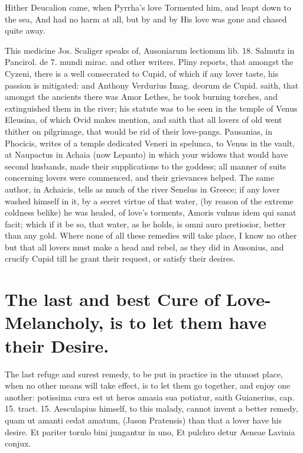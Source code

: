 {Hither Deucalion came, when Pyrrha's love
Tormented him, and leapt down to the sea,
And had no harm at all, but by and by
His love was gone and chased quite away.

This medicine Jos. Scaliger speaks of, Ausoniarum lectionum lib. 18.
Salmutz in Pancirol. de 7. mundi mirac. and other writers. Pliny
reports, that amongst the Cyzeni, there is a well consecrated to Cupid,
of which if any lover taste, his passion is mitigated: and Anthony
Verdurius Imag. deorum de Cupid. saith, that amongst the ancients there
was Amor Lethes, he took burning torches, and extinguished them
in the river; his statute was to be seen in the temple of Venus
Eleusina, of which Ovid makes mention, and saith that all lovers of old
went thither on pilgrimage, that would be rid of their love-pangs.
Pausanias, in  Phocicis, writes of a temple dedicated Veneri in
spelunca, to Venus in the vault, at Naupactus in Achaia (now Lepanto)
in which your widows that would have second husbands, made their
supplications to the goddess; all manner of suits concerning lovers
were commenced, and their grievances helped. The same author, in
Achaicis, tells as much of the river  Senelus in Greece; if any
lover washed himself in it, by a secret virtue of that water, (by
reason of the extreme coldness belike) he was healed, of love's
torments, Amoris vulnus idem qui sanat facit; which if it be so,
that water, as he holds, is omni auro pretiosior, better than any gold.
Where none of all these remedies will take place, I know no other but
that all lovers must make a head and rebel, as they did in
Ausonius, and crucify Cupid till he grant their request, or
satisfy their desires.

\section[Let them have their Desire]{The last and best Cure of Love-Melancholy, is to let them have their Desire.}

The last refuge and surest remedy, to be put in practice in the utmost
place, when no other means will take effect, is to let them go
together, and enjoy one another: potissima cura est ut heros amasia sua
potiatur, saith Guianerius, cap. 15. tract. 15. Aesculapius himself, to
this malady, cannot invent a better remedy, quam ut amanti cedat
amatum, (Jason Pratensis) than that a lover have his desire.
Et pariter torulo bini jungantur in uno,
Et pulchro detur Aeneae Lavinia conjux.

}
